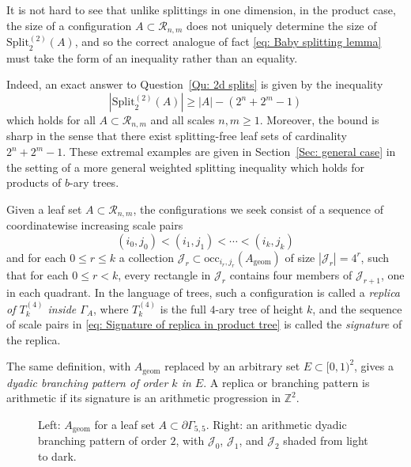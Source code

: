 \documentclass[11pt]{amsart}
\newcommand{\Z}{\mathbb{Z}}  %
\newcommand\labs[1]{\left\lvert#1\right\rvert}
\newcommand{\Split}{\mathrm{Split}}
\renewcommand{\leq}{\leqslant}
\renewcommand{\geq}{\geqslant}
\theoremstyle{plain}
\theoremstyle{definition}
\theoremstyle{remark}
\begin{document}
It is not hard to see that unlike splittings in one dimension, in the product case, the size of a configuration $A\subset \mathcal{R}_{n,m}$ does not uniquely determine the size of $\Split_2^{(2)}(A)$, and so the correct analogue of fact \eqref{eq: Baby splitting lemma} must take the form of an inequality rather than an equality.

Indeed, an exact answer to Question~\ref{Qu: 2d splits} is given by the inequality
\begin{equation}\label{eq: 2d Splitting inequal}
\labs{\Split_2^{(2)}(A)} \geq \labs{A} - (2^n+2^m -1)
\end{equation}
which holds for all $A\subset \mathcal{R}_{n,m}$ and all scales $n,m\geq 1$. Moreover, the bound is sharp in the sense that there exist splitting-free leaf sets of cardinality $2^n+2^m-1$. These extremal examples are given in Section~\ref{Sec: general case} in the setting of a more general weighted splitting inequality which holds for products of $b$-ary trees.




Given a leaf set $A\subset\mathcal R_{n,m}$, the configurations we seek consist of a sequence of coordinatewise increasing scale pairs
\begin{equation}\label{eq: Signature of replica in product tree}
(i_0,j_0)<(i_1,j_1)<\cdots<(i_k,j_k)
\end{equation}
and for each $0\leq r \leq k$ a collection $\mathcal J_r\subset\mathrm{occ}_{i_r,j_r}(A_{\mathrm{geom}})$ of size $\labs{\mathcal J_r}=4^r$, such that for each $0\leq r < k$, every rectangle in $\mathcal J_r$ contains four members of $\mathcal J_{r+1}$, one in each quadrant. In the language of trees, such a configuration is called a \textit{replica of $T_k^{(4)}$ inside $\Gamma_A$}, where $T_k^{(4)}$ is the full $4$-ary tree of height $k$, and the sequence of scale pairs in \eqref{eq: Signature of replica in product tree} is called the \textit{signature} of the replica.

The same definition, with $A_{\mathrm{geom}}$ replaced by an arbitrary set $E\subset[0,1)^2$, gives a \textit{dyadic branching pattern of order $k$ in $E$}. A replica or branching pattern is arithmetic if its signature is an arithmetic progression in $\Z^2$.

\begin{figure}[htbp]
    \centering


\caption{Left: $A_{\text{geom}}$ for a leaf set
$A\subset\partial\Gamma_{5,5}$.
Right: an arithmetic dyadic branching pattern of order $2$,
with $\mathcal J_0$, $\mathcal J_1$, and $\mathcal J_2$
shaded from light to dark.}

    \label{fig:dyadic-branching-pattern}
\end{figure}
\end{document}
